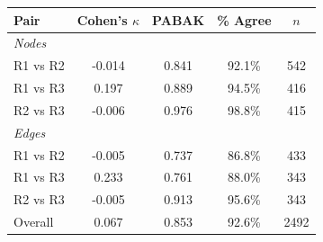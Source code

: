 \begin{tabular}{l c c c c}
\toprule
Pair & Cohen's $\kappa$ & PABAK & \% Agree & $n$ \\
\midrule
\multicolumn{5}{l}{\textit{Nodes}} \\
\midrule
  R1 vs R2 & -0.014 & 0.841 & 92.1\% & 542 \\
  R1 vs R3 & 0.197 & 0.889 & 94.5\% & 416 \\
  R2 vs R3 & -0.006 & 0.976 & 98.8\% & 415 \\
\midrule
\multicolumn{5}{l}{\textit{Edges}} \\
\midrule
  R1 vs R2 & -0.005 & 0.737 & 86.8\% & 433 \\
  R1 vs R3 & 0.233 & 0.761 & 88.0\% & 343 \\
  R2 vs R3 & -0.005 & 0.913 & 95.6\% & 343 \\
\midrule
Overall & 0.067 & 0.853 & 92.6\% & 2492 \\
\bottomrule
\end{tabular}
